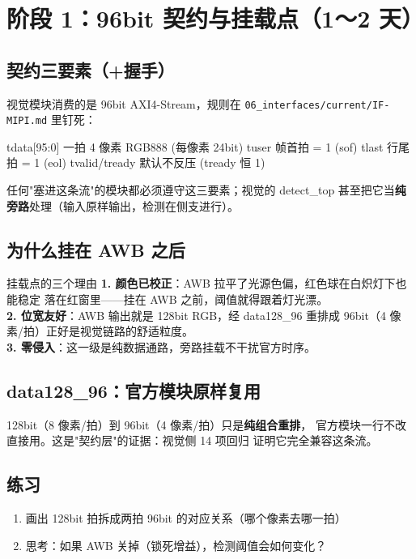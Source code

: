 \documentclass[11pt]{ctexart}
\newcommand{\code}[1]{\texttt{#1}}
\begin{document}
\section{阶段 1：96bit 契约与挂载点（1～2 天）}

\subsection{契约三要素（+握手）}

视觉模块消费的是 96bit AXI4-Stream，规则在
\code{06\_interfaces/current/IF-MIPI.md} 里钉死：

\begin{Verilog}
tdata[95:0]   一拍 4 像素 RGB888 (每像素 24bit)
tuser         帧首拍 = 1 (sof)
tlast         行尾拍 = 1 (eol)
tvalid/tready 默认不反压 (tready 恒 1)
\end{Verilog}

任何"塞进这条流"的模块都必须遵守这三要素；视觉的 detect\_top
甚至把它当\textbf{纯旁路}处理（输入原样输出，检测在侧支进行）。

\subsection{为什么挂在 AWB 之后}

\begin{keybox}{挂载点的三个理由}
\textbf{1. 颜色已校正}：AWB 拉平了光源色偏，红色球在白炽灯下也能稳定
落在红窗里——挂在 AWB 之前，阈值就得跟着灯光漂。\\
\textbf{2. 位宽友好}：AWB 输出就是 128bit RGB，经 data128\_96 重排成
96bit（4 像素/拍）正好是视觉链路的舒适粒度。\\
\textbf{3. 零侵入}：这一级是纯数据通路，旁路挂载不干扰官方时序。
\end{keybox}

\subsection{data128\_96：官方模块原样复用}

128bit（8 像素/拍）到 96bit（4 像素/拍）只是\textbf{纯组合重排}，
官方模块一行不改直接用。这是"契约层"的证据：视觉侧 14 项回归
证明它完全兼容这条流。

\subsection{练习}

\begin{enumerate}
  \item 画出 128bit 拍拆成两拍 96bit 的对应关系（哪个像素去哪一拍）
  \item 思考：如果 AWB 关掉（锁死增益），检测阈值会如何变化？
\end{enumerate}
\end{document}
